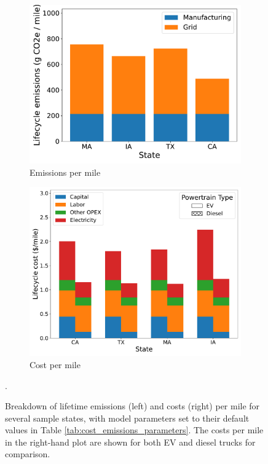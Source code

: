 \begin{figure}[H]
    \centering
    \begin{subfigure}[b]{0.49\textwidth}
        \centering
        \includegraphics[width=\textwidth]{figures/emissions_per_mile.pdf}
        \caption{Emissions per mile}
        \label{fig:emissions_breakdown}
    \end{subfigure}
    \hfill
    \begin{subfigure}[b]{0.49\textwidth}
        \centering
        \includegraphics[width=\textwidth]{figures/costs_per_mile.pdf}
        \caption{Cost per mile}
        \label{fig:costs_breakdown}
    \end{subfigure}
    \caption{Breakdown of lifetime emissions (left) and costs (right) per mile for several sample states, with model parameters set to their default values in Table \ref{tab:cost_emissions_parameters}. The costs per mile in the right-hand plot are shown for both EV and diesel trucks for comparison.}.
    \label{fig:cost_emission_breakdowns}
\end{figure}

